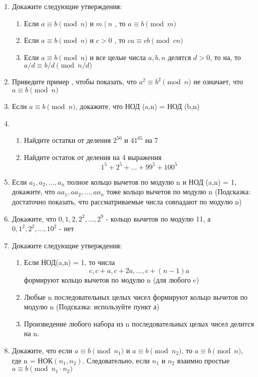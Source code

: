 \documentclass[11pt]{article}
\begin{document}
\begin{enumerate}
	\item Докажите следующие утверждения:
\begin{enumerate}
	\item Если $a \equiv b \pmod n$ и  $m\mid n$ , то $a \equiv b \pmod m$
	\item Если $a \equiv b \pmod n$ и  $c>0$ , то $ca \equiv cb \pmod {cn}$
	\item Если $a \equiv b \pmod n$ и все целые числа $a,b,n$ делятся $d>0$, то на, то \newline $a / d \equiv b / d \pmod {n / d}$
\end{enumerate}
\item Приведите пример , чтобы показать, что $a^{2}\equiv b^{2} \pmod {	n}$ не означает, что $a\equiv b \pmod {n}$
\item Если $a\equiv b \pmod {n}$, докажите, что НОД (a,n) = НОД (b,n)
\item 
\begin{enumerate}
	\item Найдите остатки от деления $2^{50}$ и $41^{65}$ на 7
	\item Найдите остаток от деления на 4 выражения $$1^{5}+2^{5}+...+99^{5}+100^{5}$$ 
	\end{enumerate}
\item Если $a_1, a_2 , ..., a_n$ полное кольцо вычетов по модулю n и НОД (a,n) = 1, докажите, что \newline 
$aa_1,aa_2,...,aa_n$ тоже кольцо вычетов по модулю n (Подсказка: достаточно показать, что рассматриваемые числа  совпадают по модулю n) 
\item Докажите, что $0, 1, 2, 2^{2},...,2^{9}$ - кольцо вычетов по модулю 11, а $0, 1^{2}, 2^{2},...,10^{2}$ - нет
\item Докажите следующие утверждения:
\begin{enumerate}
	\item Если НОД(a,n) = 1, то числа $$c,c+a,c+2a,...,c+(n-1)a$$ формируют кольцо вычетов по модулю n (для любого c)
	\item Любые n последовательных целых чисел формируют кольцо вычетов по модулю n (Подсказка: используйте пункт а)
	\item Произведение любого набора из n последовательных целых чисел делится на n.
\end{enumerate}
\item Докажите, что если $a\equiv b \pmod {n_1}$ и $a\equiv b \pmod {n_2}$, то $a\equiv b \pmod {n}$, где n = НОК$(n_1,n_2)$. Следовательно, если $n_1$ и $n_2$ взаимно простые $a\equiv b \pmod {n_1\cdot n_2}$


\end{enumerate}
\end{document}
